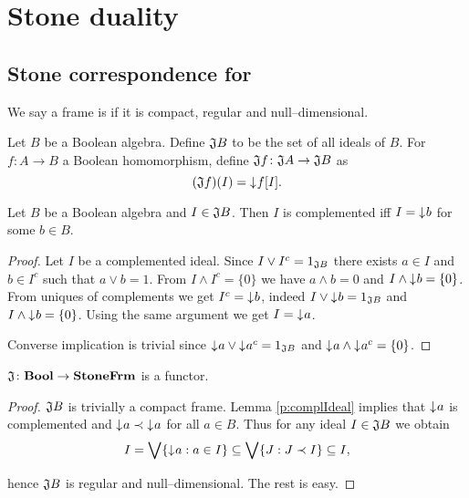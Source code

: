 \chapter{Stone duality}
\section{Stone correspondence for \StoneFrm}
\begin{definition}
    We say a frame is  if it is compact, regular and null--dimensional.
\end{definition}

\begin{definition}
    Let $B$ be a Boolean algebra. Define $\DEFSYM{J}{\J} B$ to be the set of all ideals of $B$.
    For $f\colon A \to B$ a Boolean homomorphism, define $\mathfrak{J} f\colon \mathfrak{J} A \to \mathfrak{J} B$ as
    $$(\mathfrak{J} f)(I) = \mathord{\downarrow}\mkern1mu f[I].$$
\end{definition}

\begin{lemma}\label{p:complIdeal}
    Let $B$ be a Boolean algebra and $I \in \mathfrak{J} B$. Then $I$ is complemented iff $I = \mathord{\downarrow}\mkern1mu b$ for some $b \in B$.
\end{lemma}
\begin{proof}
    Let $I$ be a complemented ideal. Since $I \vee I^c = 1_{\mathfrak{J} B}$ there exists $a \in I$ and $b \in I^c$ such that $a \vee b = 1$. From $I \wedge I^c = \{0\}$ we have $a \wedge b = 0$ and $I \wedge \mathord{\downarrow}\mkern1mu b = \{0\}$.
    From uniques of complements we get $I^c = \mathord{\downarrow}\mkern1mu b$, indeed $I \vee \mathord{\downarrow}\mkern1mu b = 1_{\mathfrak{J} B}$ and $I \wedge \mathord{\downarrow}\mkern1mu b = \{0\}$. Using the same argument we get $I = \mathord{\downarrow}\mkern1mu a$.

    Converse implication is trivial since $\mathord{\downarrow}\mkern1mu a \vee \mathord{\downarrow}\mkern1mu a^c = 1_{\mathfrak{J} B}$ and $\mathord{\downarrow}\mkern1mu a \wedge \mathord{\downarrow}\mkern1mu a^c = \{0\}$.
\end{proof}

\begin{proposition}\label{p:JisFunctor}
    $\mathfrak{J}\colon \mathbf{Bool} \to \mathbf{StoneFrm}$ is a functor.
\end{proposition}
\begin{proof}
    $\mathfrak{J} B$ is trivially a compact frame. Lemma \ref{p:complIdeal} implies that $\mathord{\downarrow}\mkern1mu a$ is complemented and $\mathord{\downarrow}\mkern1mu a \prec \mathord{\downarrow}\mkern1mu a$ for all $a \in B$. Thus for any ideal $I \in \mathfrak{J} B$ we obtain
    $$ I = \bigvee \{ \mathord{\downarrow}\mkern1mu a : a \in I \} \subseteq \bigvee \{ J : J \prec I \} \subseteq I,$$

\noindent hence $\mathfrak{J} B$ is regular and null--dimensional. The rest is easy.
\end{proof}

